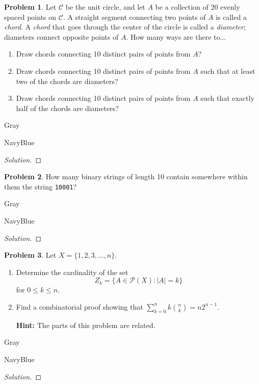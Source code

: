 \documentclass[12pt]{amsart}
\newcounter{problem_number}[section]
\theoremstyle{named}
\newenvironment{soln}
{\begin{color}{Gray}\begin{framed}\begin{color}{NavyBlue}\begin{proof}[Solution]
\doublespacing}
{\end{proof}\end{color}\end{framed}\end{color}}
\theoremstyle{definition}
\newtheorem{problem}{Problem}
\begin{document}
\begin{problem}
	Let $\mathcal C$ be the unit circle, and let $A$ be a collection of 20 evenly spaced points on $\mathcal C$.
	A straight segment connecting two points of $A$ is called a \emph{chord}.
	A \emph{chord} that goes through the center of the circle is called a \emph{diameter}; diameters connect opposite points of $A$.
	How many ways are there to...
	\begin{enumerate}
		\item Draw chords connecting 10 distinct pairs of points from $A$?
		\item Draw chords connecting 10 distinct pairs of points from $A$ such that at least two of the chords are diameters?
		\item Draw chords connecting 10 distinct pairs of points from $A$ such that exactly half of the chords are diameters?
	\end{enumerate}
\end{problem}

\begin{soln}

\end{soln}

\begin{problem}
	How many binary strings of length 10 contain somewhere within them the string \verb|10001|?
\end{problem}

\begin{soln}

\end{soln}
\begin{problem}
	Let $X=\{1,2,3,\ldots,n\}$.
	\begin{enumerate}
		\item Determine the cardinality of the set 
		$$Z_k = \{A\in\mathscr{P}(X)\colon |A|=k\}$$
		for $0\leq k\leq n$.
	\item Find a combinatorial proof showing that $\displaystyle\sum_{k=0}^nk\binom{n}{k} = n2^{n-1}$.

	\textbf{Hint:} The parts of this problem are related.
	\end{enumerate}
\end{problem}

\begin{soln}

\end{soln}
\end{document}
